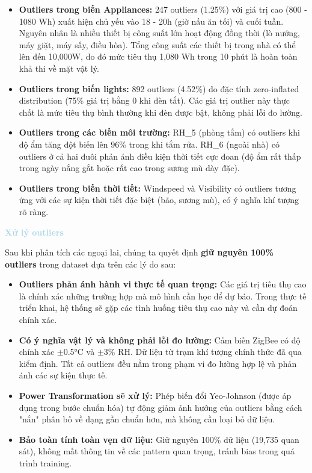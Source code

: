 \begin{itemize}
    \item \textbf{Outliers trong biến Appliances:} 247 outliers (1.25\%) với giá trị cao (800 - 1080 Wh) xuất hiện chủ yếu vào 18 - 20h (giờ nấu ăn tối) và cuối tuần. Nguyên nhân là nhiều thiết bị công suất lớn hoạt động đồng thời (lò nướng, máy giặt, máy sấy, điều hòa). Tổng công suất các thiết bị trong nhà có thể lên đến 10,000W, do đó mức tiêu thụ 1,080 Wh trong 10 phút là hoàn toàn khả thi về mặt vật lý.
    
    \item \textbf{Outliers trong biến lights:} 892 outliers (4.52\%) do đặc tính zero-inflated distribution (75\% giá trị bằng 0 khi đèn tắt). Các giá trị outlier này thực chất là mức tiêu thụ bình thường khi đèn được bật, không phải lỗi đo lường.
    
    \item \textbf{Outliers trong các biến môi trường:} RH\_5 (phòng tắm) có outliers khi độ ẩm tăng đột biến lên 96\% trong khi tắm rửa. RH\_6 (ngoài nhà) có outliers ở cả hai đuôi phản ánh điều kiện thời tiết cực đoan (độ ẩm rất thấp trong ngày nắng gắt hoặc rất cao trong sương mù dày đặc).
    
    \item \textbf{Outliers trong biến thời tiết:} Windspeed và Visibility có outliers tương ứng với các sự kiện thời tiết đặc biệt (bão, sương mù), có ý nghĩa khí tượng rõ ràng.
\end{itemize}

\vspace{0.5em}
\noindent\textcolor{lightblue}{\textbf{Xử lý outliers}}
\vspace{0.5em}

Sau khi phân tích các ngoại lai, chúng ta quyết định \textbf{giữ nguyên 100\% outliers} trong dataset dựa trên các lý do sau:

\begin{itemize}
    \item \textbf{Outliers phản ánh hành vi thực tế quan trọng:} Các giá trị tiêu thụ cao là chính xác những trường hợp mà mô hình cần học để dự báo. Trong thực tế triển khai, hệ thống sẽ gặp các tình huống tiêu thụ cao này và cần dự đoán chính xác. 
    
    \item \textbf{Có ý nghĩa vật lý và không phải lỗi đo lường:} Cảm biến ZigBee có độ chính xác $\pm$0.5°C và $\pm$3\% RH. Dữ liệu từ trạm khí tượng chính thức đã qua kiểm định. Tất cả outliers đều nằm trong phạm vi đo lường hợp lệ và phản ánh các sự kiện thực tế.
    
    \item \textbf{Power Transformation sẽ xử lý:} Phép biến đổi Yeo-Johnson (được áp dụng trong bước chuẩn hóa) tự động giảm ảnh hưởng của outliers bằng cách "nắn" phân bố về dạng gần chuẩn hơn, mà không cần loại bỏ dữ liệu.
    
    \item \textbf{Bảo toàn tính toàn vẹn dữ liệu:} Giữ nguyên 100\% dữ liệu (19,735 quan sát), không mất thông tin về các pattern quan trọng, tránh bias trong quá trình training.
\end{itemize}

